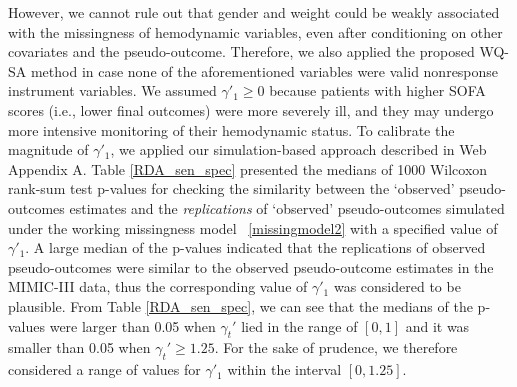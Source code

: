 \documentclass[12pt]{article}
\begin{document}
However, we cannot rule out that gender and weight could be weakly associated with the missingness of hemodynamic variables, even after conditioning on other covariates and the pseudo-outcome. Therefore, we also applied the proposed  WQ-SA method  in case none of the aforementioned variables were valid nonresponse instrument variables. We assumed $\gamma'_1 \geq 0$ because patients with higher SOFA scores (i.e., lower final outcomes) were more severely ill, and they may undergo more intensive monitoring of their hemodynamic status. 
To calibrate the magnitude of $\gamma'_1$, we applied our simulation-based approach described in Web Appendix A.     Table \ref{RDA_sen_spec} presented the medians of 1000   Wilcoxon rank-sum test p-values for checking the similarity between the `observed' pseudo-outcomes estimates and the \textit{replications} of `observed' pseudo-outcomes simulated under the working missingness model ~\eqref{missingmodel2} with a specified value of $\gamma'_1$. A large median of the p-values indicated that 
the replications of  observed pseudo-outcomes were similar to the observed  pseudo-outcome estimates in the MIMIC-III data, thus 
the corresponding value of $\gamma'_1$ was considered to be plausible. From Table \ref{RDA_sen_spec}, we can  see that the medians of   the p-values were larger than 0.05 when $\gamma_t'$ lied in the range of $[0,1]$ and it was smaller than 0.05 when $\gamma_t' \geq 1.25$. For the sake of prudence, we therefore considered a range of values for $\gamma'_1$ within the interval $[0, 1.25]$.
\end{document}

